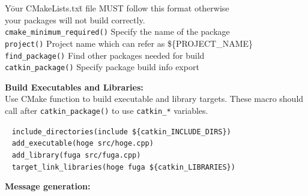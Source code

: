 \documentclass[10pt,landscape]{article}
\begin{document}
\begin{multicols}{3}
{
\begin{tabbing}
Y\=our CMakeLists.tx\=t file MUST follow this format otherwise\\ your
packages will not build correctly.\\
\> \texttt{cmake\_minimum\_required()} Specify the name of the package\\
\> \texttt{project()} Project name which can refer as \$\{PROJECT\_NAME\}\\
\> \texttt{find\_package()} \> Find other packages needed for build\\
\> \texttt{catkin\_package()} \> Specify package build info export\\
\end{tabbing}
}
\vspace{-3.5mm}
\vspace{-1mm}
{\bf Build Executables and Libraries:}\\
Use CMake function to build executable and library targets. These
macro should call after \texttt{catkin\_package()} to use
\texttt{catkin\_*} variables.
\vspace{-1.5mm}
{
\begin{tabbing}
~ \texttt{include\_directories(include \$\{catkin\_INCLUDE\_DIRS\})}\\
~ \texttt{add\_executable(hoge src/hoge.cpp)}\\
~ \texttt{add\_library(fuga src/fuga.cpp)}\\
~ \texttt{target\_link\_libraries(hoge fuga \$\{catkin\_LIBRARIES\})}\\
\end{tabbing}
}
\vspace{-3.5mm}
\vspace{-1mm}
{\bf Message generation:}\\

\end{multicols}
\end{document}
